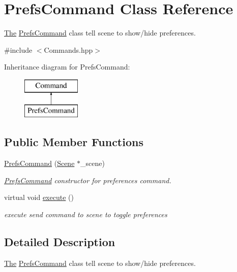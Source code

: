 \hypertarget{class_prefs_command}{}\section{Prefs\+Command Class Reference}
\label{class_prefs_command}


\hyperlink{namespace_the}{The} \hyperlink{class_prefs_command}{Prefs\+Command} class tell scene to show/hide preferences.  




{\ttfamily \#include $<$Commands.\+hpp$>$}

Inheritance diagram for Prefs\+Command\+:\begin{figure}[H]
\begin{center}
\leavevmode
\includegraphics[height=2.000000cm]{class_prefs_command}
\end{center}
\end{figure}
\subsection*{Public Member Functions}
\begin{DoxyCompactItemize}
\item 
\hyperlink{class_prefs_command_a758eac187338886794a64ee5bb81ef67}{Prefs\+Command} (\hyperlink{class_scene}{Scene} $\ast$\+\_\+scene)
\begin{DoxyCompactList}\small\item\em \hyperlink{class_prefs_command}{Prefs\+Command} constructor for preferences command. \end{DoxyCompactList}\item 
\hypertarget{class_prefs_command_a2630ecaa2917935c3478c80c18b1e242}{}virtual void \hyperlink{class_prefs_command_a2630ecaa2917935c3478c80c18b1e242}{execute} ()\label{class_prefs_command_a2630ecaa2917935c3478c80c18b1e242}

\begin{DoxyCompactList}\small\item\em execute send command to scene to toggle preferences \end{DoxyCompactList}\end{DoxyCompactItemize}


\subsection{Detailed Description}
\hyperlink{namespace_the}{The} \hyperlink{class_prefs_command}{Prefs\+Command} class tell scene to show/hide preferences. 

